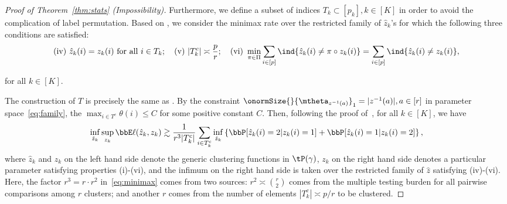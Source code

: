 \documentclass[lettersize,onecolumn,journal]{IEEEtran}
\theoremstyle{definition}
\theoremstyle{definition}
\begin{document}
\begin{proof}[Proof of Theorem~\ref{thm:stats} (Impossibility)]
{%

}

Furthermore, we define a subset of indices $T_k \subset [p_k], k \in [K]$ in order to avoid the complication of label permutation. Based on \citet[Proof of Theorem 6]{han2020exact}, we consider the minimax rate over the restricted family of $\hat z_k$'s for which the following three conditions are satisfied:
\begin{equation}
    \text{(iv)}\ \hat z_k(i)=z_k(i) \text{ for all }i\in T_k; \quad \text{(v)} \ |T^c_k|\asymp {p\over r}; \quad \text{(vi)}\ \min_{\pi\in \Pi}\sum_{i\in[p]}\ind\{\hat z_k(i) \neq \pi\circ z_k (i)\} = \sum_{i\in[p]}\ind\{\hat z_k(i) \neq  z_k (i)\},
\end{equation}


\normalsize
for all $k \in [K]$.

{
\color{blue}
 The construction of $T$ is precisely the same as \citet[Proof of Theorem 2]{gao2018community}. By the constraint $\onormSize{}{\mtheta_{z^{-1}(a)}}_1 = |z^{-1}(a)|, a \in [r]$  in parameter space~\eqref{eq:family}, the $\max_{i \in T^c} \theta(i) \leq C$ for some positive constant $C$. Then, following the proof of~\citet[Theorem 2]{gao2018community}, 
}
for all $k \in [K]$, we have
\begin{equation}\label{eq:minimax}
\inf_{\hat z_k}\sup_{z_k}\bbE \ell(\hat z_k, z_k) \gtrsim {1\over r^3 |T^c_k|}\sum_{i\in T^c_k}\inf_{\hat z_k}\left\{\bbP[\hat z_k(i)=2|z_k(i)=1] + \bbP[\hat z_k(i)=1|z_k(i)=2] \right\},
\end{equation}
where $\hat z_k$ and $z_k$ on the left hand side denote the generic clustering functions in $\tP(\gamma)$, $z_k$ on the right hand side denotes a particular parameter satisfying properties (i)-(vi), and the infimum on the right hand side is taken over the restricted family of $\hat z$ satisfying (iv)-(vi). Here, the factor $r^3=r\cdot r^2$ in~\eqref{eq:minimax} comes from two sources: $r^2\asymp {r\choose 2}$ comes from the multiple testing burden for all pairwise comparisons among $r$ clusters; and another $r$ comes from the number of elements $|T^c_k|\asymp p/r$ to be clustered. 


\end{proof}
\end{document}
